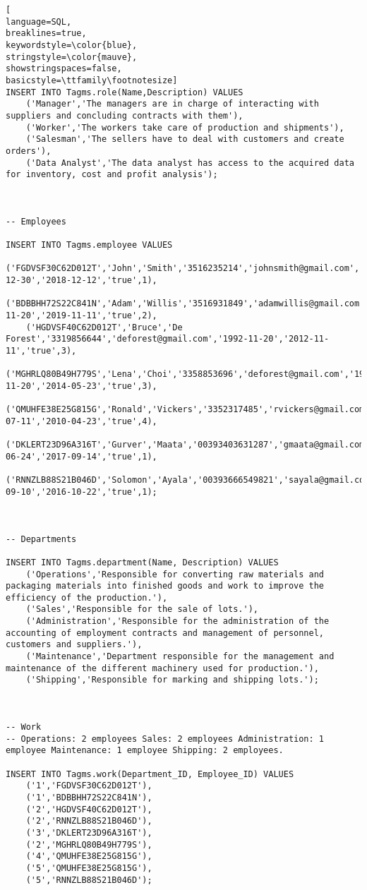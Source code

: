 \begin{lstlisting}[
language=SQL,
breaklines=true,
keywordstyle=\color{blue},
stringstyle=\color{mauve},
showstringspaces=false,
basicstyle=\ttfamily\footnotesize]
INSERT INTO Tagms.role(Name,Description) VALUES
    ('Manager','The managers are in charge of interacting with suppliers and concluding contracts with them'),
    ('Worker','The workers take care of production and shipments'),
    ('Salesman','The sellers have to deal with customers and create orders'),
    ('Data Analyst','The data analyst has access to the acquired data for inventory, cost and profit analysis');



-- Employees

INSERT INTO Tagms.employee VALUES
    ('FGDVSF30C62D012T','John','Smith','3516235214','johnsmith@gmail.com','1995-12-30','2018-12-12','true',1),
    ('BDBBHH72S22C841N','Adam','Willis','3516931849','adamwillis@gmail.com','1993-11-20','2019-11-11','true',2),
    ('HGDVSF40C62D012T','Bruce','De Forest','3319856644','deforest@gmail.com','1992-11-20','2012-11-11','true',3),
    ('MGHRLQ80B49H779S','Lena','Choi','3358853696','deforest@gmail.com','1992-11-20','2014-05-23','true',3),
    ('QMUHFE38E25G815G','Ronald','Vickers','3352317485','rvickers@gmail.com','1998-07-11','2010-04-23','true',4),
    ('DKLERT23D96A316T','Gurver','Maata','00393403631287','gmaata@gmail.com','1953-06-24','2017-09-14','true',1),
    ('RNNZLB88S21B046D','Solomon','Ayala','00393666549821','sayala@gmail.com','1952-09-10','2016-10-22','true',1);



-- Departments

INSERT INTO Tagms.department(Name, Description) VALUES
    ('Operations','Responsible for converting raw materials and packaging materials into finished goods and work to improve the efficiency of the production.'),
    ('Sales','Responsible for the sale of lots.'),
    ('Administration','Responsible for the administration of the accounting of employment contracts and management of personnel, customers and suppliers.'),
    ('Maintenance','Department responsible for the management and maintenance of the different machinery used for production.'),
    ('Shipping','Responsible for marking and shipping lots.');



-- Work
-- Operations: 2 employees Sales: 2 employees Administration: 1 employee Maintenance: 1 employee Shipping: 2 employees.

INSERT INTO Tagms.work(Department_ID, Employee_ID) VALUES
    ('1','FGDVSF30C62D012T'),
    ('1','BDBBHH72S22C841N'),
    ('2','HGDVSF40C62D012T'),
    ('2','RNNZLB88S21B046D'),
    ('3','DKLERT23D96A316T'),
    ('2','MGHRLQ80B49H779S'),
    ('4','QMUHFE38E25G815G'),
    ('5','QMUHFE38E25G815G'),
    ('5','RNNZLB88S21B046D');




\end{lstlisting}

